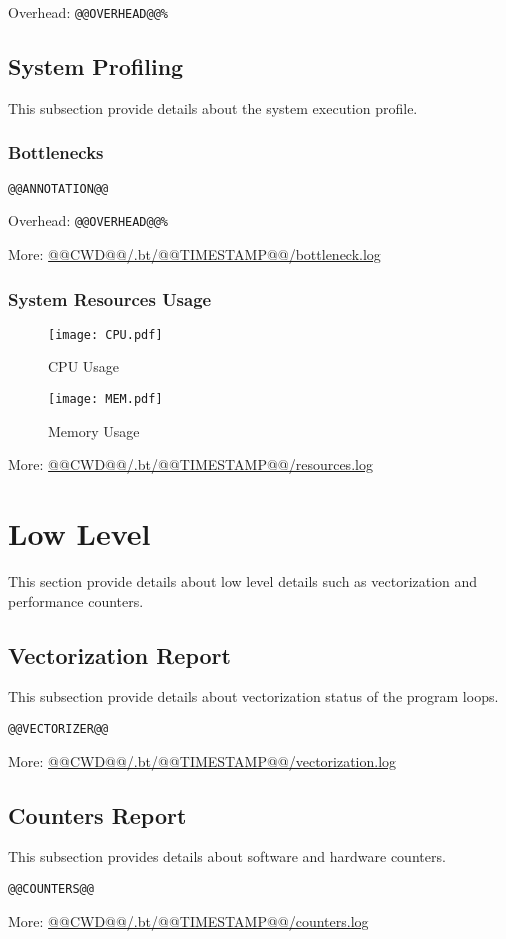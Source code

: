 \documentclass[a4paper]{article}
\begin{document}
Overhead: {\tt @@OVERHEAD@@\%}

\subsection{System Profiling}

This subsection provide details about the system execution profile.

\subsubsection{Bottlenecks}

\begin{verbatim}
@@ANNOTATION@@
\end{verbatim}

Overhead: {\tt @@OVERHEAD@@\%}

More: \url{@@CWD@@/.bt/@@TIMESTAMP@@/bottleneck.log}

\subsubsection{System Resources Usage}

\begin{figure}[H]
\label{fig:normal}
\centering
\texttt{[image: CPU.pdf]}
\caption{CPU Usage}
\end{figure}

\begin{figure}[H]
\label{fig:normal}
\centering
\texttt{[image: MEM.pdf]}
\caption{Memory Usage}
\end{figure}

More: \url{@@CWD@@/.bt/@@TIMESTAMP@@/resources.log}

\section{Low Level}

This section provide details about low level details such as vectorization and performance counters.

\subsection{Vectorization Report}

This subsection provide details about vectorization status of the program loops.

\begin{verbatim}
@@VECTORIZER@@
\end{verbatim}

More: \url{@@CWD@@/.bt/@@TIMESTAMP@@/vectorization.log}

\subsection{Counters Report}

This subsection provides details about software and hardware counters.

\begin{verbatim}
@@COUNTERS@@
\end{verbatim}

More: \url{@@CWD@@/.bt/@@TIMESTAMP@@/counters.log}
\end{document}
